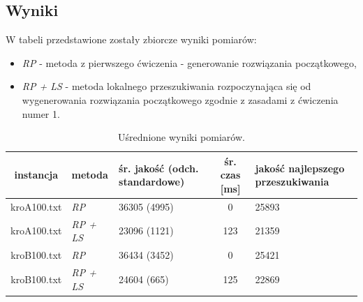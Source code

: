 \documentclass{article}
\begin{document}
\subsection{Wyniki}
W tabeli przedstawione zostały zbiorcze wyniki pomiarów:
\begin{itemize}
	\item \emph{RP} - metoda z pierwszego ćwiczenia - generowanie rozwiązania początkowego,
	\item \emph{RP + LS} - metoda lokalnego przeszukiwania rozpoczynająca się od wygenerowania rozwiązania początkowego zgodnie z zasadami z ćwiczenia numer 1. 
\end{itemize}
	

\begin{table}[h!]
\begin{center}
\centering
  \begin{tabular}{| c | D | S | c | S | }
\hline
	instancja & metoda & śr. jakość (odch. standardowe) & śr. czas [ms] & jakość najlepszego przeszukiwania \\ \hline
    kroA100.txt & \emph{RP} & 36305 (4995) & 0 & 25893 \\
    kroA100.txt & \emph{RP + LS} & 23096 (1121) & 123 & 21359 \\
\hline
    kroB100.txt & \emph{RP} & 36434 (3452) & 0 & 25421 \\
    kroB100.txt & \emph{RP + LS} & 24604 (665) & 125 & 22869 \\
\hline
  \end{tabular}
\end{center}
\caption{Uśrednione wyniki pomiarów.} \label{tab:wynikils}
\end{table}
\end{document}
